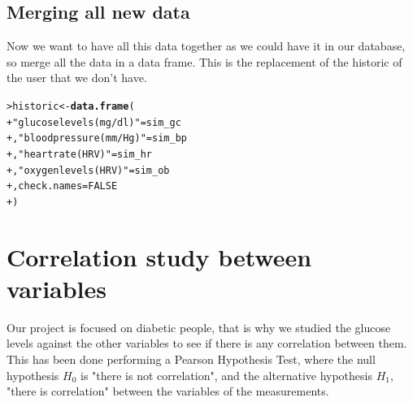 \documentclass{article}\usepackage[]{graphicx}\usepackage[]{xcolor}
\makeatletter
\newcommand{\hlnum}[1]{\textcolor[rgb]{0.686,0.059,0.569}{#1}}%
\newcommand{\hlstr}[1]{\textcolor[rgb]{0.192,0.494,0.8}{#1}}%
\newcommand{\hlstd}[1]{\textcolor[rgb]{0.345,0.345,0.345}{#1}}%
\newcommand{\hlkwb}[1]{\textcolor[rgb]{0.69,0.353,0.396}{#1}}%
\newcommand{\hlkwc}[1]{\textcolor[rgb]{0.333,0.667,0.333}{#1}}%
\newcommand{\hlkwd}[1]{\textcolor[rgb]{0.737,0.353,0.396}{\textbf{#1}}}%
\newenvironment{kframe}{%
 \def\at@end@of@kframe{}%
 \ifinner\ifhmode%
  \def\at@end@of@kframe{\end{minipage}}%
  \begin{minipage}{\columnwidth}%
 \fi\fi%
 \def\FrameCommand##1{\hskip\@totalleftmargin \hskip-\fboxsep
 \colorbox{shadecolor}{##1}\hskip-\fboxsep
     \hskip-\linewidth \hskip-\@totalleftmargin \hskip\columnwidth}%
 \MakeFramed {\advance\hsize-\width
   \@totalleftmargin\z@ \linewidth\hsize
   \@setminipage}}%
 {\par\unskip\endMakeFramed%
 \at@end@of@kframe}
\newenvironment{knitrout}{}{} %
\makeatother
\begin{document}
\subsection*{Merging all new data}
Now we want to have all this data together as we could have it in our database, so merge all the data in a data frame. This is the replacement of the historic of the user that we don't have.
\begin{knitrout}\footnotesize
{}\color{fgcolor}\begin{kframe}
\begin{alltt}
\hlstd{> }\hlstd{historic} \hlkwb{<-} \hlkwd{data.frame}\hlstd{(}
\hlstd{+ }  \hlstr{"glucose levels (mg/dl)"} \hlstd{= sim_gc}
\hlstd{+ }  \hlstd{,}\hlstr{"blood pressure (mm/Hg)"} \hlstd{= sim_bp}
\hlstd{+ }  \hlstd{,}\hlstr{"heart rate (HRV)"} \hlstd{= sim_hr}
\hlstd{+ }  \hlstd{,}\hlstr{"oxygen levels (HRV)"} \hlstd{= sim_ob}
\hlstd{+ }  \hlstd{,}\hlkwc{check.names}\hlstd{=}\hlnum{FALSE}
\hlstd{+ }\hlstd{)}
\end{alltt}
\end{kframe}
\end{knitrout}
\section{Correlation study between variables}
Our project is focused on diabetic people, that is why we studied the glucose levels against the other variables to see if there is any correlation between them. This has been done performing a Pearson Hypothesis Test, where the null hypothesis $H_0$ is "there is not correlation", and the alternative hypothesis $H_1$, "there is correlation" between the variables of the measurements.
\end{document}
